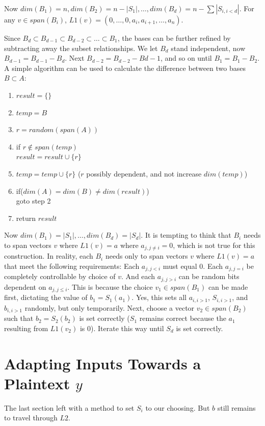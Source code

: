 \documentclass{article}
\begin{document}
Now $dim(B_1)=n, dim(B_2)=n - |S_1|, \ldots ,dim(B_d)=n - \sum{|S_{i, i<d}|}$.
For any $v \in span(B_i)$, $L1(v) = (0, \ldots, 0, a_{i}, a_{i+1}, \ldots, a_n)$.

Since $B_d \subset B_{d-1} \subset B_{d-2} \subset \ldots \subset B_{1}$, the bases can be further refined by subtracting away the subset relationships.
We let $B_d$ stand independent, now $B_{d-1} = B_{d-1} - B_d$. Next $B_{d-2} = B_{d-2} - B{d-1}$, and so on until $B_1 = B_1 - B_2$.
A simple algorithm can be used to calculate the difference between two bases $B \subset A$:

\begin{enumerate}
\item $result = \{\}$
\item $temp = B$
\item $r = random(span(A))$
\item if $r \not\in span(temp)$ \\
       $result = result \cup \{r\}$
\item $temp = temp \cup \{r\}$ ($r$ possibly dependent, and not increase $dim(temp)$)
\item if($dim(A) = dim(B) \neq dim(result)$) \\
       goto step 2
\item return $result$
\end{enumerate}

Now $dim(B_1)=|S_1|, \ldots , dim(B_d)=|S_d|$.
It is tempting to think that $B_i$ needs to span vectors $v$ where $L1(v) = a$ where $a_{j, j\neq i} = 0$, which is not true for this construction.
In reality, each $B_i$ needs only to span vectors $v$ where $L1(v) = a$ that meet the following requirements:
Each $a_{j, j<i}$ must equal 0.
Each $a_{j, j=i}$ be completely controllable by choice of $v$.
And each $a_{j, j>i}$ can be random bits dependent on $a_{j, j\leq i}$.
This is because the choice $v_1 \in span(B_1)$ can be made first, dictating the value of $b_1 = S_1(a_1)$.
Yes, this sets all $a_{i, i>1}$, $S_{i, i>1}$, and $b_{i, i>1}$ randomly, but only temporarily.
Next, choose a vector $v_2 \in span(B_2)$ such that $b_2 = S_2(b_2)$ is set correctly
($S_1$ remains correct because the $a_1$ resulting from $L1(v_2)$ is 0).
Iterate this way until $S_d$ is set correctly.

\section{Adapting Inputs Towards a Plaintext $y$}
The last section left with a method to set $S_i$ to our choosing. But $b$ still remains to travel through $L2$.
\end{document}

